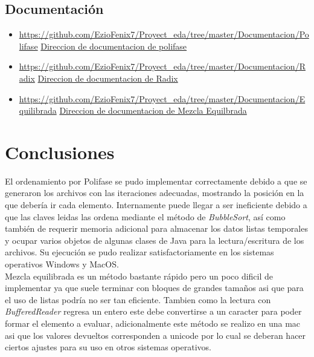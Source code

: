 \documentclass{article}
\begin{document}
	\subsection{Documentación}
		\begin{itemize}
			\item \url{https://github.com/EzioFenix7/Proyect_eda/tree/master/Documentacion/Polifase}
			\href{https://github.com/EzioFenix7/Proyect_eda/tree/master/Documentacion/Polifase}{Direccion de documentacion de polifase}
			
			\item \url{https://github.com/EzioFenix7/Proyect_eda/tree/master/Documentacion/Radix}
			\href{https://github.com/EzioFenix7/Proyect_eda/tree/master/Documentacion/Radix}{Direccion de documentacion de Radix}
			
			\item 	\url{https://github.com/EzioFenix7/Proyect_eda/tree/master/Documentacion/Equilibrada}
			\href{https://github.com/EzioFenix7/Proyect_eda/tree/master/Documentacion/Equilibrada}{Direccion de documentacion de Mezcla Equilbrada}
		\end{itemize}

	\section{Conclusiones}
	El ordenamiento por Polifase se pudo implementar correctamente debido a que se generaron los archivos con las iteraciones adecuadas, mostrando la posición en la que debería ir cada elemento.
	Internamente puede llegar a ser ineficiente debido a que las claves leidas las ordena mediante el método de \textit{BubbleSort}, así como también de requerir memoria adicional para almacenar
	los datos listas temporales y ocupar varios objetos de algunas clases de Java para la lectura/escritura de los archivos. Su ejecución se pudo realizar satisfactoriamente en los sistemas operativos
	Windows y MacOS.\\
	
	Mezcla equilibrada es un método bastante rápido pero un poco dificil de implementar ya que suele terminar con bloques de grandes tamaños asi que para el uso de listas podría no ser tan eficiente. Tambien como la lectura con \textit{BufferedReader} regresa un entero este debe convertirse a un caracter para poder formar el elemento a evaluar, adicionalmente este método se realizo en una mac asi que los valores devueltos corresponden a unicode por lo cual se deberan hacer ciertos ajustes para su uso en otros sistemas operativos.\\
	
\end{document}
